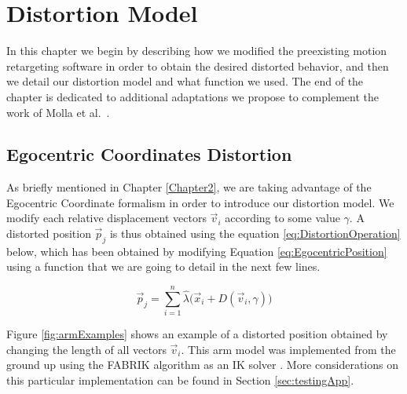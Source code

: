 
\chapter{Distortion Model} %

\label{Chapter3} %

In this chapter we begin by describing how we modified the preexisting motion retargeting software in order to obtain the desired distorted behavior, and then we detail our distortion model and what function we used. The end of the chapter is dedicated to additional adaptations we propose to complement the work of Molla et al.\ \cite{molla2017egocentric}.

\section{Egocentric Coordinates Distortion}

As briefly mentioned in Chapter \ref{Chapter2}, we are taking advantage of the Egocentric Coordinate formalism in order to introduce our distortion model. We modify each relative displacement vectors $\vec{v}_i$ according to some value $\gamma$. A distorted position $\vec{p}_j$ is thus obtained using the equation \ref{eq:DistortionOperation} below, which has been obtained by modifying Equation \ref{eq:EgocentricPosition} using a function that we are going to detail in the next few lines.

\begin{equation}
\label{eq:DistortionOperation}
\vec{p}_j = \displaystyle\sum_{i=1}^{n} \hat{\lambda}\big(\vec{x}_i + D(\vec{v}_i,\gamma )\big)
\end{equation}

Figure \ref{fig:armExamples} shows an example of a distorted position obtained by changing the length of all vectors $\vec{v}_i$. This arm model was implemented from the ground up using the FABRIK algorithm as an IK solver \cite{aristidou2011fabrik}. More considerations on this particular implementation can be found in Section \ref{sec:testingApp}.

